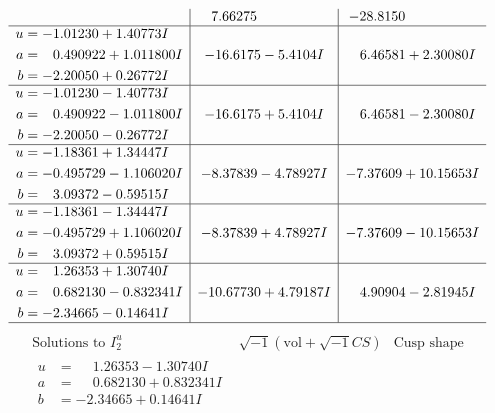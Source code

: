 \documentclass[1p]{elsarticle_modified}
\theoremstyle{definition}
\newcommand{\I}{\sqrt{-1}}
\begin{document}
$$\begin{array}{c|c|c}
 & \phantom{-}7.66275\phantom{ +0.000000I} & -28.8150\phantom{ +0.000000I} \\ \hline\begin{aligned}
u &= -1.01230 + 1.40773 I \\
a &= \phantom{-}0.490922 + 1.011800 I \\
b &= -2.20050 + 0.26772 I\end{aligned}
 & -16.6175 - 5.4104 I & \phantom{-}6.46581 + 2.30080 I \\ \hline\begin{aligned}
u &= -1.01230 - 1.40773 I \\
a &= \phantom{-}0.490922 - 1.011800 I \\
b &= -2.20050 - 0.26772 I\end{aligned}
 & -16.6175 + 5.4104 I & \phantom{-}6.46581 - 2.30080 I \\ \hline\begin{aligned}
u &= -1.18361 + 1.34447 I \\
a &= -0.495729 - 1.106020 I \\
b &= \phantom{-}3.09372 - 0.59515 I\end{aligned}
 & -8.37839 - 4.78927 I & -7.37609 + 10.15653 I \\ \hline\begin{aligned}
u &= -1.18361 - 1.34447 I \\
a &= -0.495729 + 1.106020 I \\
b &= \phantom{-}3.09372 + 0.59515 I\end{aligned}
 & -8.37839 + 4.78927 I & -7.37609 - 10.15653 I \\ \hline\begin{aligned}
u &= \phantom{-}1.26353 + 1.30740 I \\
a &= \phantom{-}0.682130 - 0.832341 I \\
b &= -2.34665 - 0.14641 I\end{aligned}
 & -10.67730 + 4.79187 I & \phantom{-}4.90904 - 2.81945 I\\
 \hline 
 \end{array}$$\newpage$$\begin{array}{c|c|c}  
\text{Solutions to }I^u_{2}& \I (\text{vol} + \sqrt{-1}CS) & \text{Cusp shape}\\
 \hline 
\begin{aligned}
u &= \phantom{-}1.26353 - 1.30740 I \\
a &= \phantom{-}0.682130 + 0.832341 I \\
b &= -2.34665 + 0.14641 I\end{aligned}

\end{array}$$
\end{document}

